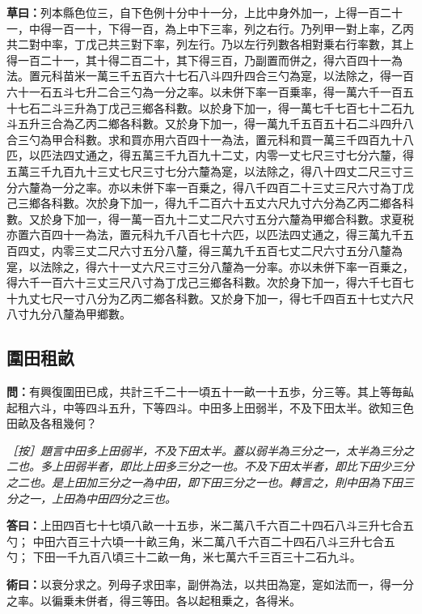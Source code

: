 \documentclass[11pt,a4paper]{article}
\newcommand{\Question}[1]{\par\noindent\textbf{\color{problemcolor}問：}#1\par}
\newcommand{\Answer}[1]{\par\noindent\textbf{\color{answercolor}答曰：}#1\par}
\newcommand{\Method}[1]{\par\noindent\textbf{\color{methodcolor}術曰：}#1\par}
\newcommand{\Working}[1]{\par\noindent\textbf{草曰：}#1\par}
\newcommand{\EditorialNote}[1]{\par\noindent\textit{［按］#1}\par}
\begin{document}
\Working{列本縣色位三，自下色例十分中十一分，上比中身外加一，上得一百二十一，中得一百一十，下得一百，為上中下三率，列之右行。乃列甲一對上率，乙丙共二對中率，丁戊己共三對下率，列左行。乃以左行列數各相對乗右行率數，其上得一百二十一，其十得二百二十，其下得三百，乃副置而併之，得六百四十一為法。置元科苗米一萬三千五百六十七石八斗四升四合三勺為寔，以法除之，得一百六十一石五斗七升二合三勺為一分之率。以未併下率一百乗率，得一萬六千一百五十七石二斗三升為丁戊己三鄉各科數。以於身下加一，得一萬七千七百七十二石九斗五升三合為乙丙二鄉各科數。又於身下加一，得一萬九千五百五十石二斗四升八合三勺為甲合科數。求和買亦用六百四十一為法，置元科和買一萬三千四百九十八匹，以匹法四丈通之，得五萬三千九百九十二丈，内零一丈七尺三寸七分六釐，得五萬三千九百九十三丈七尺三寸七分六釐為寔，以法除之，得八十四丈二尺三寸三分六釐為一分之率。亦以未併下率一百乗之，得八千四百二十三丈三尺六寸為丁戊己三鄉各科數。次於身下加一，得九千二百六十五丈六尺九寸六分為乙丙二鄉各科數。又於身下加一，得一萬一百九十二丈二尺六寸五分六釐為甲鄉合科數。求夏税亦置六百四十一為法，置元科九千八百七十六匹，以匹法四丈通之，得三萬九千五百四丈，内零三丈二尺六寸五分八釐，得三萬九千五百七丈二尺六寸五分八釐為寔，以法除之，得六十一丈六尺三寸三分八釐為一分率。亦以未併下率一百乗之，得六千一百六十三丈三尺八寸為丁戊己三鄉各科數。次於身下加一，得六千七百七十九丈七尺一寸八分为乙丙二鄉各科數。又於身下加一，得七千四百五十七丈六尺八寸九分八釐為甲鄉數。}

\newpage
\subsection*{\color{sectioncolor}圍田租畝}

\Question{有興復圍田已成，共計三千二十一頃五十一畝一十五歩，分三等。其上等毎畆起租六斗，中等四斗五升，下等四斗。中田多上田弱半，不及下田太半。欲知三色田畝及各租幾何？}

\EditorialNote{題言中田多上田弱半，不及下田太半。蓋以弱半為三分之一，太半為三分之二也。多上田弱半者，即比上田多三分之一也。不及下田太半者，即比下田少三分之二也。是上田加三分之一為中田，即下田三分之一也。轉言之，則中田為下田三分之一，上田為中田四分之三也。}

\Answer{上田四百七十七頃八畝一十五歩，米二萬八千六百二十四石八斗三升七合五勺；
中田六百三十六頃一十畝三角，米二萬八千六百二十四石八斗三升七合五勺；
下田一千九百八頃三十二畝一角，米七萬六千三百三十二石九斗。}

\Method{以衰分求之。列母子求田率，副併為法，以共田為寔，寔如法而一，得一分之率。以徧乗未併者，得三等田。各以起租乗之，各得米。}
\end{document}
